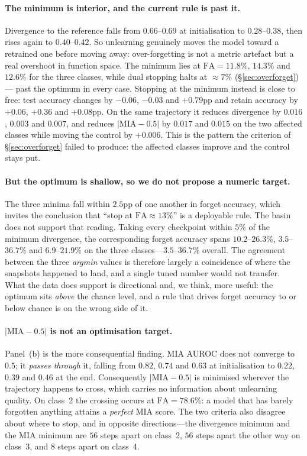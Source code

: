 \documentclass{article}
\theoremstyle{remark}
\theoremstyle{plain}
\begin{document}
\paragraph{The minimum is interior, and the current rule is past it.}
Divergence to the reference falls from $0.66$--$0.69$ at initialisation to
$0.28$--$0.38$, then rises again to $0.40$--$0.42$. So unlearning genuinely
moves the model toward a retrained one before moving away: over-forgetting is
not a metric artefact but a real overshoot in function space. The minimum lies
at $\mathrm{FA} = 11.8\%$, $14.3\%$ and $12.6\%$ for the three classes, while
dual stopping halts at ${\approx}7\%$ (\S\ref{sec:overforget}) --- past the
optimum in every case. Stopping at the minimum instead is close to free: test
accuracy changes by $-0.06$, $-0.03$ and $+0.79$pp and retain accuracy by
$+0.06$, $+0.36$ and $+0.08$pp. On the same trajectory it reduces divergence by
$0.016$, $0.003$ and $0.007$, and reduces $|\mathrm{MIA}-0.5|$ by $0.017$ and
$0.015$ on the two affected classes while moving the control by $+0.006$. This
is the pattern the criterion of \S\ref{sec:overforget} failed to produce:
the affected classes improve and the control stays put.

\paragraph{But the optimum is shallow, so we do not propose a numeric target.}
The three minima fall within $2.5$pp of one another in forget accuracy, which
invites the conclusion that ``stop at $\mathrm{FA}\approx 13\%$'' is a
deployable rule. The basin does not support that reading. Taking every
checkpoint within $5\%$ of the minimum divergence, the corresponding forget
accuracy spans $10.2$--$26.3\%$, $3.5$--$36.7\%$ and $6.9$--$21.9\%$ on the
three classes---$3.5$--$36.7\%$ overall. The agreement between the three
\emph{argmin} values is therefore largely a coincidence of where the snapshots
happened to land, and a single tuned number would not transfer. What the data
does support is directional and, we think, more useful: the optimum sits
\emph{above} the chance level, and a rule that drives forget accuracy to or
below chance is on the wrong side of it.

\paragraph{$|\mathrm{MIA}-0.5|$ is not an optimisation target.}
Panel~(b) is the more consequential finding. MIA AUROC does not converge to
$0.5$; it \emph{passes through} it, falling from $0.82$, $0.74$ and $0.63$ at
initialisation to $0.22$, $0.39$ and $0.46$ at the end. Consequently
$|\mathrm{MIA}-0.5|$ is minimised wherever the trajectory happens to cross,
which carries no information about unlearning quality. On class~2 the crossing
occurs at $\mathrm{FA} = 78.6\%$: a model that has barely forgotten anything
attains a \emph{perfect} MIA score. The two criteria also disagree about where
to stop, and in opposite directions---the divergence minimum and the MIA
minimum are $56$ steps apart on class~2, $56$ steps apart the other way on
class~3, and $8$ steps apart on class~4.
\end{document}
